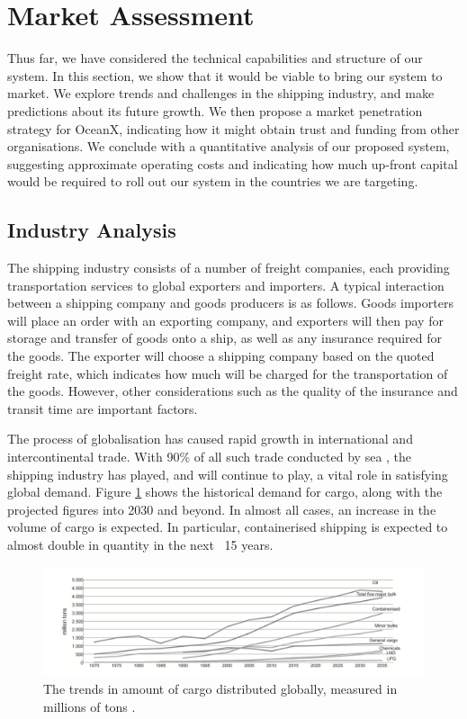 \newpage
\section{Market Assessment}

Thus far, we have considered the technical capabilities and structure of our system. In this section, we show that it would be viable to bring our system to market. We explore trends and challenges in the shipping industry, and make predictions about its future growth. We then propose a market penetration strategy for OceanX, indicating how it might obtain trust and funding from other organisations. We conclude with a quantitative analysis of our proposed system, suggesting approximate operating costs and indicating how much up-front capital would be required to roll out our system in the countries we are targeting. 

\subsection{Industry Analysis}

The shipping industry consists of a number of freight companies, each providing transportation services to global exporters and importers. A typical interaction between a shipping company and goods producers is as follows. Goods importers will place an order with an exporting company, and exporters will then pay for storage and transfer of goods onto a ship, as well as any insurance required for the goods. The exporter will choose a shipping company based on the quoted freight rate, which indicates how much will be charged for the transportation of the goods. However, other considerations such as the quality of the insurance and transit time are important factors. 

The process of globalisation has caused rapid growth in international and intercontinental trade. With 90\% of all such trade conducted by sea \cite{IMOfacts}, the shipping industry has played, and will continue to play, a vital role in satisfying global demand. Figure \ref{fig:cargo_trends} shows the historical demand for cargo, along with the projected figures into 2030 and beyond. In almost all cases, an increase in the volume of cargo is expected. In particular, containerised shipping is expected to almost double in quantity in the next ~15 years.

\begin{figure}[h!]
	\includegraphics[width=\textwidth]{images/trade_trends}
	\caption{The trends in amount of cargo distributed globally, measured in millions of tons \cite{BluePlanet}.}
	\label{fig:cargo_trends}
\end{figure}

